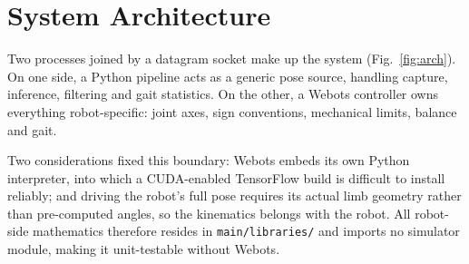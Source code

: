 \documentclass[twocolumn]{article}
\begin{document}
\section{System Architecture}

Two processes joined by a datagram socket make up the system (Fig.~\ref{fig:arch}). On one
side, a Python pipeline acts as a generic pose source, handling capture, inference, filtering
and gait statistics. On the other, a Webots controller owns everything robot-specific: joint
axes, sign conventions, mechanical limits, balance and gait.

Two considerations fixed this boundary: Webots embeds its own Python interpreter, into which a
CUDA-enabled TensorFlow build is difficult to install reliably; and driving the robot's full
pose requires its actual limb geometry rather than pre-computed angles, so the kinematics
belongs with the robot. All robot-side mathematics therefore resides in
\texttt{main/libraries/} and imports no simulator module, making it unit-testable without
Webots.
\end{document}
